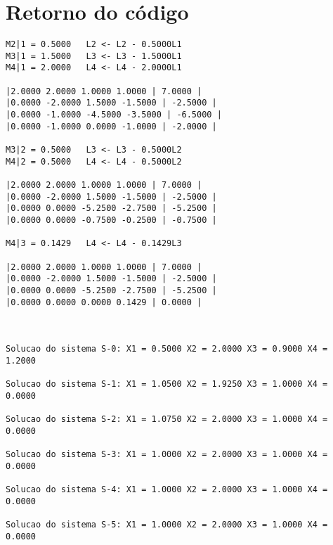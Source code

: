 \documentclass[12pt]{article}
\begin{document}
        \section{Retorno do código}


            \begin{verbatim}
M2|1 = 0.5000   L2 <- L2 - 0.5000L1
M3|1 = 1.5000   L3 <- L3 - 1.5000L1
M4|1 = 2.0000   L4 <- L4 - 2.0000L1

|2.0000 2.0000 1.0000 1.0000 | 7.0000 |
|0.0000 -2.0000 1.5000 -1.5000 | -2.5000 |
|0.0000 -1.0000 -4.5000 -3.5000 | -6.5000 |
|0.0000 -1.0000 0.0000 -1.0000 | -2.0000 |

M3|2 = 0.5000   L3 <- L3 - 0.5000L2
M4|2 = 0.5000   L4 <- L4 - 0.5000L2

|2.0000 2.0000 1.0000 1.0000 | 7.0000 |
|0.0000 -2.0000 1.5000 -1.5000 | -2.5000 |
|0.0000 0.0000 -5.2500 -2.7500 | -5.2500 |
|0.0000 0.0000 -0.7500 -0.2500 | -0.7500 |

M4|3 = 0.1429   L4 <- L4 - 0.1429L3

|2.0000 2.0000 1.0000 1.0000 | 7.0000 |
|0.0000 -2.0000 1.5000 -1.5000 | -2.5000 |
|0.0000 0.0000 -5.2500 -2.7500 | -5.2500 |
|0.0000 0.0000 0.0000 0.1429 | 0.0000 |



Solucao do sistema S-0: X1 = 0.5000 X2 = 2.0000 X3 = 0.9000 X4 = 1.2000

Solucao do sistema S-1: X1 = 1.0500 X2 = 1.9250 X3 = 1.0000 X4 = 0.0000

Solucao do sistema S-2: X1 = 1.0750 X2 = 2.0000 X3 = 1.0000 X4 = 0.0000

Solucao do sistema S-3: X1 = 1.0000 X2 = 2.0000 X3 = 1.0000 X4 = 0.0000

Solucao do sistema S-4: X1 = 1.0000 X2 = 2.0000 X3 = 1.0000 X4 = 0.0000

Solucao do sistema S-5: X1 = 1.0000 X2 = 2.0000 X3 = 1.0000 X4 = 0.0000

            \end{verbatim}
\end{document}
